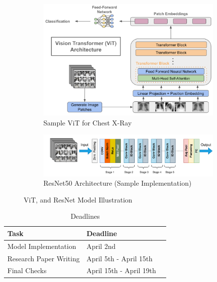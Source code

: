 \documentclass{article}
\begin{document}
\label{appendix}
\begin{figure}[htbp]
  \centering
  \begin{subfigure}[b]{0.4\textwidth}
    \includegraphics[width=\textwidth]{model1.png}
    \caption{Sample ViT for Chest X-Ray \cite{transformers}}
  \end{subfigure}
  \hfill
  \begin{subfigure}[b]{0.5\textwidth}
    \includegraphics[width=\textwidth]{model2.png}
    \caption{ResNet50 Architecture (Sample Implementation)}
  \end{subfigure}
  \caption{ViT, and ResNet Model Illustration}
\end{figure}


\begin{table}
  \caption{Deadlines}
  \label{sample-table}
  \centering
  \begin{tabular}{lll}
    \toprule
    \cmidrule(r){1-2}
    Task     & Deadline  \\
    \midrule
    Model Implementation     & April 2nd  \\
    Research Paper Writing     & April 5th - April 15th      \\
    Final Checks & April 15th - April 19th \\
    \bottomrule
  \end{tabular}
\end{table}








\end{document}
